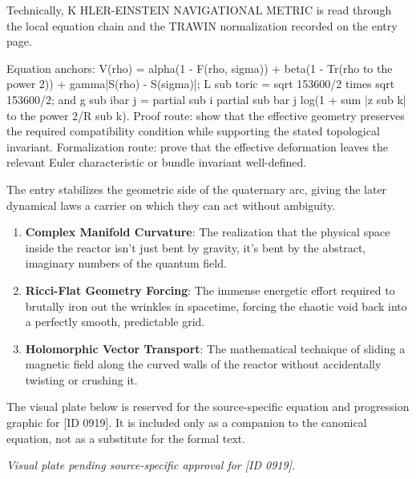 Technically, K HLER-EINSTEIN NAVIGATIONAL METRIC is read through the local equation chain and the TRAWIN normalization recorded on the entry page.

Equation anchors: V(rho) = alpha(1 - F(rho, sigma)) + beta(1 - Tr(rho to the power 2)) + gamma|S(rho) - S(sigma)|; L sub toric = sqrt 153600/2 times sqrt 153600/2; and g sub ibar j = partial sub i partial sub bar j log(1 + sum |z sub k| to the power 2/R sub k). Proof route: show that the effective geometry preserves the required compatibility condition while supporting the stated topological invariant. Formalization route: prove that the effective deformation leaves the relevant Euler characteristic or bundle invariant well-defined.

The entry stabilizes the geometric side of the quaternary arc, giving the later dynamical laws a carrier on which they can act without ambiguity.
\endgroup

\begin{enumerate}[leftmargin=1.6em,itemsep=6pt,topsep=4pt]
\item \textbf{Complex Manifold Curvature}: The realization that the physical space inside the reactor isn't just bent by gravity, it's bent by the abstract, imaginary numbers of the quantum field.
\item \textbf{Ricci-Flat Geometry Forcing}: The immense energetic effort required to brutally iron out the wrinkles in spacetime, forcing the chaotic void back into a perfectly smooth, predictable grid.
\item \textbf{Holomorphic Vector Transport}: The mathematical technique of sliding a magnetic field along the curved walls of the reactor without accidentally twisting or crushing it.
\end{enumerate}

\begingroup\footnotesize\sloppy
The visual plate below is reserved for the source-specific equation and progression graphic for [ID 0919]. It is included only as a companion to the canonical equation, not as a substitute for the formal text.
\par\endgroup
\begingroup\footnotesize\itshape
Visual plate pending source-specific approval for [ID 0919].
\par\endgroup

